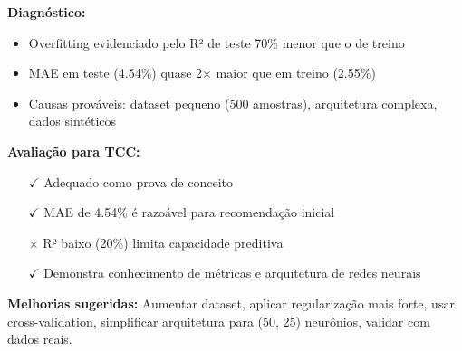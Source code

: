 \textbf{Diagnóstico:}
\begin{itemize}
    \item Overfitting evidenciado pelo R² de teste 70\% menor que o de treino
    \item MAE em teste (4.54\%) quase 2× maior que em treino (2.55\%)
    \item Causas prováveis: dataset pequeno (500 amostras), arquitetura complexa, dados sintéticos
\end{itemize}

\textbf{Avaliação para TCC:}
\begin{itemize}
    \item[$\checkmark$] Adequado como prova de conceito
    \item[$\checkmark$] MAE de 4.54\% é razoável para recomendação inicial
    \item[$\times$] R² baixo (20\%) limita capacidade preditiva
    \item[$\checkmark$] Demonstra conhecimento de métricas e arquitetura de redes neurais
\end{itemize}

\textbf{Melhorias sugeridas:}
Aumentar dataset, aplicar regularização mais forte, usar cross-validation, simplificar arquitetura para (50, 25) neurônios, validar com dados reais.
